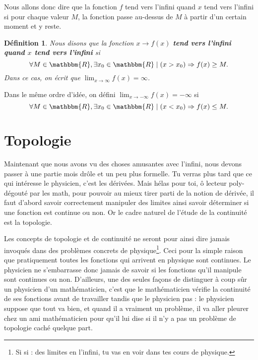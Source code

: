 \documentclass[a4paper,12pt]{book}
\newcommand{\eR}{\mathbbm{R}}
\newcounter{numtho}
\theoremstyle{mes_exemples}	\newtheorem{exemple}[numtho]{Exemple}
\theoremstyle{mes_tho}
\newtheorem{definition}[numtho]{Définition}
\newcommand{\defe}[2]{\textbf{#1}\index{#2}}
\newcommand{\tq}{\mid}
\begin{document}
Nous allons donc dire que la fonction $f$ tend vers l'infini quand $x$ tend vers l'infini si pour chaque valeur $M$, la fonction passe au-dessus de $M$ à partir d'un certain moment et y reste.
\begin{definition}
Nous disons que la fonction $x\to f(x)$ \defe{tend vers l'infini quand $x$ tend vers l'infini}{} si
\begin{equation}
\forall M\in\eR,\exists x_0\in\eR\tq (x>x_0)\Rightarrow f(x)\geq M.
\end{equation}
Dans ce cas, on écrit que $\lim_{x\to\infty}f(x)=\infty$.
\end{definition}
Dans le même ordre d'idée, on défini $\lim_{x\to-\infty}f(x)=-\infty$ si 
\begin{equation}
\forall M\in\eR,\exists x_0\in\eR\tq (x<x_0)\Rightarrow f(x)\leq M.
\end{equation}




	\section{Topologie}

Maintenant que nous avons vu des choses amusantes avec l'infini, nous devons passer à une partie mois drôle et un peu plus formelle. Tu verras plus tard que ce qui intéresse le physicien, c'est les dérivées. Mais hélas pour toi, ô lecteur poly-dégouté par les math, pour pouvoir au mieux tirer parti de la notion de dérivée, il faut d'abord savoir correctement manipuler des limites ainsi savoir déterminer si une fonction est continue ou non. Or le cadre naturel de l'étude de la continuité est la topologie.

Les concepts de topologie et de continuité ne seront pour ainsi dire jamais invoqués dans des problèmes concrets de physique\footnote{Si si : des limites en l'infini, tu vas en voir dans tes cours de physique.}. Ceci pour la simple raison que pratiquement toutes les fonctions qui arrivent en physique sont continues. Le physicien ne s'embarrasse donc jamais de savoir si les fonctions qu'il manipule sont continues ou non. D'ailleurs, une des seules façons de distinguer à coup sûr un physicien d'un mathématicien, c'est que le mathématicien vérifie la continuité de ses fonctions avant de travailler tandis que le physicien pas : le physicien suppose que tout va bien, et quand il a vraiment un problème, il va aller pleurer chez un ami mathématicien pour qu'il lui dise si il n'y a pas un problème de topologie caché quelque part.
\end{document}
